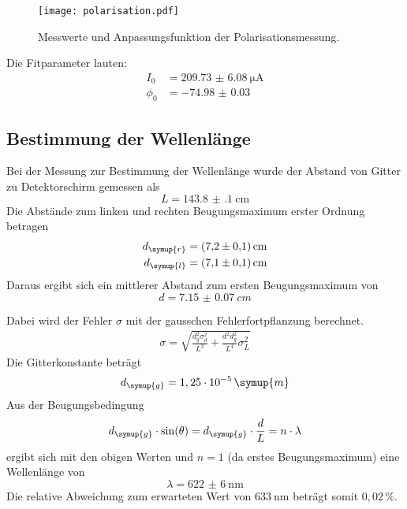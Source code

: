 \begin{figure}[H]
  \centering
  \texttt{[image: polarisation.pdf]}
  \caption{Messwerte und Anpassungsfunktion der Polarisationsmessung.}
  \label{fig:polarisation}
\end{figure}

Die Fitparameter lauten:
\begin{align*}
  I_0 &= \SI{209.73(608)}{\micro\ampere} \\
  \phi_0 &= \SI{-74.98(3)}{}
\end{align*}

\subsection{Bestimmung der Wellenlänge}
Bei der Messung zur Bestimmung der Wellenlänge wurde der Abstand von Gitter zu
Detektorschirm gemessen als
\begin{equation*}
  L = \SI{143.8(1)}{\centi\meter}
\end{equation*}
Die Abstände zum linken und rechten Beugungsmaximum erster Ordnung betragen
\begin{align*}
  d_\symup{r} &= \SI{7.2(1)}{\centi\meter} \\
  d_\symup{l} &= \SI{7.1(1)}{\centi\meter}
\end{align*}
Daraus ergibt sich ein mittlerer Abstand zum ersten Beugungsmaximum von
\begin{equation*}
  d = \SI{7.15(7)}{cm}
\end{equation*}

Dabei wird der Fehler $\sigma$ mit der gausschen Fehlerfortpflanzung berechnet.
\begin{align*}
  \sigma = \sqrt{\frac{d_{g}^{2} \sigma_{d}^{2}}{L^{2}} + \frac{d^{2} d_{g}^{2}}{L^{4}} \sigma_{L}^{2}}
\end{align*}
Die Gitterkonstante beträgt
\begin{equation*}
  d_\symup{g} = 1,25 \cdot 10^{-5} \, \symup{m}
\end{equation*}
Aus der Beugungsbedingung
\begin{equation*}
  d_\symup{g} \cdot \sin(\theta) = d_\symup{g} \cdot \frac{d}{L} = n \cdot \lambda
\end{equation*}
ergibt sich mit den obigen Werten und $n = 1$ (da erstes Beugungsmaximum) eine
Wellenlänge von
\begin{equation*}
  \lambda = \SI{622(6)}{\nano\meter}
\end{equation*}
Die relative Abweichung zum erwarteten Wert von $\SI{633}{\nano\meter}$ beträgt
somit $0,02\,\%$.
